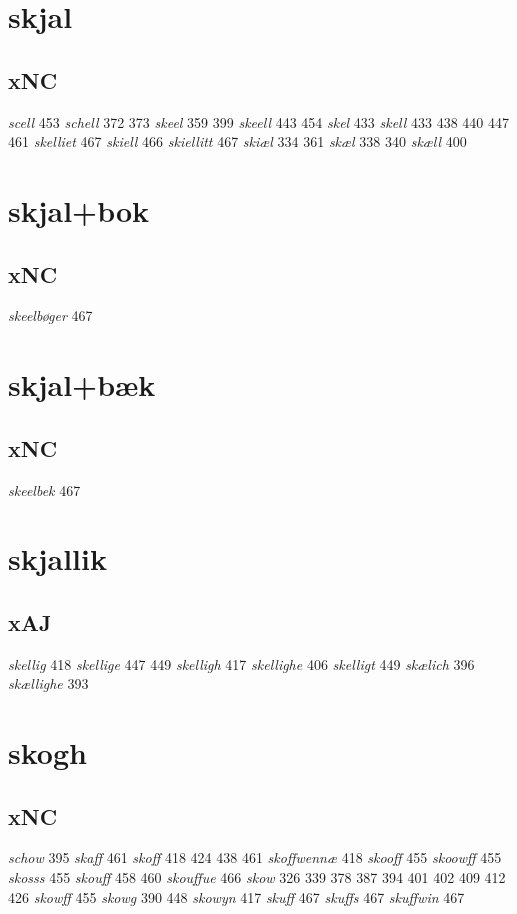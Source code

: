 \documentclass[a4paper,twocolumn]{article}
\begin{document}
\section{skjal}
\label{sec:org217a287}
\subsection{xNC}
\label{sec:org6487eb2}
\emph{scell} 453 \emph{schell} 372 373 \emph{skeel} 359 399 \emph{skeell} 443 454 \emph{skel} 433 \emph{skell} 433 438 440 447 461 \emph{skelliet} 467 \emph{skiell} 466 \emph{skiellitt} 467 \emph{skiæl} 334 361 \emph{skæl} 338 340 \emph{skæll} 400 
\section{skjal+bok}
\label{sec:orgf637747}
\subsection{xNC}
\label{sec:orgfaf1122}
\emph{skeelbøger} 467 
\section{skjal+bæk}
\label{sec:orgf02c4d4}
\subsection{xNC}
\label{sec:orgbb3c457}
\emph{skeelbek} 467 
\section{skjallik}
\label{sec:org9ab3618}
\subsection{xAJ}
\label{sec:org7c1aa92}
\emph{skellig} 418 \emph{skellige} 447 449 \emph{skelligh} 417 \emph{skellighe} 406 \emph{skelligt} 449 \emph{skælich} 396 \emph{skællighe} 393 
\section{skogh}
\label{sec:org40d5e1e}
\subsection{xNC}
\label{sec:org2bc340f}
\emph{schow} 395 \emph{skaff} 461 \emph{skoff} 418 424 438 461 \emph{skoffwennæ} 418 \emph{skooff} 455 \emph{skoowff} 455 \emph{skosss} 455 \emph{skouff} 458 460 \emph{skouffue} 466 \emph{skow} 326 339 378 387 394 401 402 409 412 426 \emph{skowff} 455 \emph{skowg} 390 448 \emph{skowyn} 417 \emph{skuff} 467 \emph{skuffs} 467 \emph{skuffwin} 467 
\end{document}

